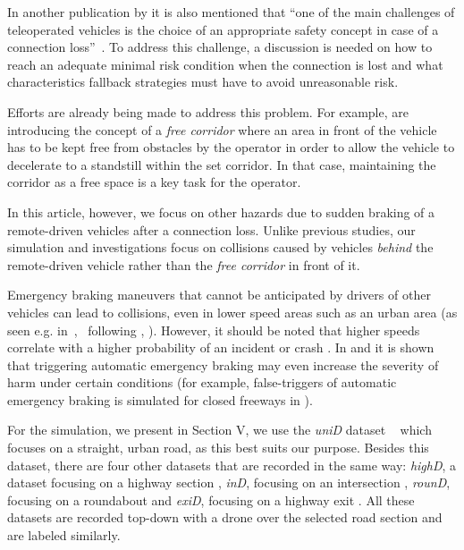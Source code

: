 In another publication by \citeauthor{Tang2014} it is also mentioned that ``one of the main challenges of teleoperated vehicles is the choice of an appropriate safety concept in case of a connection loss''~\cite[1399]{Tang2014}.
To address this challenge, a discussion is needed on how to reach an adequate minimal risk condition when the connection is lost and what characteristics fallback strategies must have to avoid unreasonable risk.


Efforts are already being made to address this problem. For example, \cite{Diermeyer2011, Tang2014, Hoffmann2022} are introducing the concept of a \emph{free corridor} where an area in front of the vehicle has to be kept free from obstacles by the operator in order to allow the vehicle to decelerate to a standstill within the set corridor.
In that case, maintaining the corridor as a free space is a key task for the operator.

In this article, however, we focus on other hazards due to sudden braking of a remote-driven vehicles after a connection loss.
Unlike previous studies, our simulation and investigations focus on collisions caused by vehicles \emph{behind} the remote-driven vehicle rather than the \emph{free corridor} in front of it.


Emergency braking maneuvers that cannot be anticipated by drivers of other vehicles can lead to collisions, even in lower speed areas such as an urban area (as seen e.g. in~\cite{NHTSA2007},~\cite{Distner2009} following \cite{Avery2008}, \cite{Beyerer2019}). However, it should be noted that higher speeds correlate with a higher probability of an incident or crash \cite{NHTSA2007}.
In \cite{Heck2015} and \cite{Beyerer2019} it is shown that triggering automatic emergency braking may even increase the severity of harm under certain conditions (for example, false-triggers of automatic emergency braking is simulated for closed freeways in \cite{Faerber2005}).

For the simulation, we present in Section V, we use the \emph{uniD} dataset ~\cite{Krajewski2018, Bock2019, Krajewski2020, Moers2022} which focuses on a straight, urban road, as this best suits our purpose. 
Besides this dataset, there are four other datasets that are recorded in the same way: \emph{highD}, a dataset focusing on a highway section \cite{Krajewski2018}, \emph{inD}, focusing on an intersection \cite{Bock2019}, \emph{rounD}, focusing on a roundabout \cite{Krajewski2020} and \emph{exiD}, focusing on a highway exit \cite{Moers2022}.
All these datasets are recorded top-down with a drone over the selected road section and are labeled similarly. 

